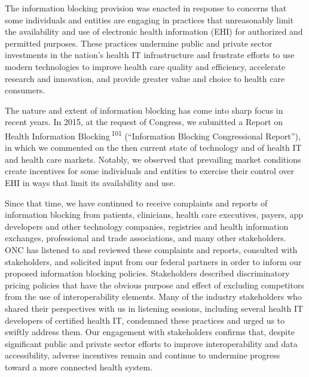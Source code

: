\documentclass[twoside,11pt]{article}
\begin{document}
          The information blocking provision was enacted in response to concerns that some individuals and entities are engaging in practices that unreasonably limit the availability and use of electronic health information (EHI) for authorized and permitted purposes. These practices undermine public and private sector investments in the nation's health IT infrastructure and frustrate efforts to use modern technologies to improve health care quality and efficiency, accelerate research and innovation, and provide greater value and choice to health care consumers.


          The nature and extent of information blocking has come into sharp focus in recent years. In 2015, at the request of Congress, we submitted a Report on Health Information Blocking \textsuperscript{101}
             (“Information Blocking Congressional Report”), in which we commented on the then current state of technology and of health IT and health care markets. Notably, we observed that prevailing market conditions create incentives for some individuals and entities to exercise their control over EHI in ways that limit its availability and use.




          Since that time, we have continued to receive complaints and reports of information blocking from patients, clinicians, health care executives, payers, app developers and other technology companies, registries and health information exchanges, professional and trade associations, and many other stakeholders. ONC has listened to and reviewed these complaints and reports, consulted with stakeholders, and solicited input from our federal partners in order to inform our proposed information blocking policies. Stakeholders described discriminatory pricing policies that have the obvious purpose and effect of excluding competitors from the use of interoperability elements. Many of the industry stakeholders who shared their perspectives with us in listening sessions, including several health IT developers of certified health IT, condemned these practices and urged us to swiftly address them. Our engagement with stakeholders confirms that, despite significant public and private sector efforts to improve interoperability and data accessibility, adverse incentives remain and continue to undermine progress toward a more connected health system.
\end{document}

